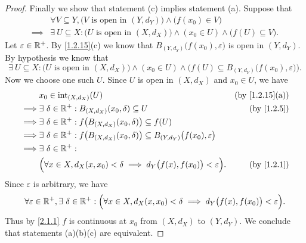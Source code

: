 \begin{proof}
  Finally we show that statement (c) implies statement (a).
  Suppose that
  \begin{align*}
             & \forall V \subseteq Y, \big(V \text{ is open in } (Y, d_Y)\big) \land \big(f(x_0) \in V\big)                          \\
    \implies & \exists\ U \subseteq X : \big(U \text{ is open in } (X, d_X)\big) \land (x_0 \in U) \land \big(f(U) \subseteq V\big).
  \end{align*}
  Let \(\varepsilon \in \mathbb{R}^+\).
  By \cref{1.2.15}(c) we know that \(B_{(Y, d_Y)}\big(f(x_0), \varepsilon\big)\) is open in \((Y, d_Y)\).
  By hypothesis we know that
  \[
    \exists\ U \subseteq X : \big(U \text{ is open in } (X, d_X)\big) \land (x_0 \in U) \land \Big(f(U) \subseteq B_{(Y, d_Y)}\big(f(x_0), \varepsilon\big)\Big).
  \]
  Now we choose one such \(U\).
  Since \(U\) is open in \((X, d_X)\) and \(x_0 \in U\), we have
  \begin{align*}
             & x_0 \in \text{int}_{(X, d_X)}(U)                                                                                    & \text{(by \cref{1.2.15}(a))} \\
    \implies & \exists\ \delta \in \R^+ : B_{(X, d_X)}(x_0, \delta) \subseteq U                                                    & \text{(by \cref{1.2.5})}     \\
    \implies & \exists\ \delta \in \R^+ : f\big(B_{(X, d_X)}(x_0, \delta)\big) \subseteq f(U)                                                                     \\
    \implies & \exists\ \delta \in \R^+ : f\big(B_{(X, d_X)}(x_0, \delta)\big) \subseteq B_{(Y, d_Y)}\big(f(x_0), \varepsilon\big)                                \\
    \implies & \exists\ \delta \in \R^+ :                                                                                                                         \\
             & \Big(\forall x \in X, d_X(x, x_0) < \delta \implies d_Y\big(f(x), f(x_0)\big) < \varepsilon\Big).                   & \text{(by \cref{1.2.1})}
  \end{align*}
  Since \(\varepsilon\) is arbitrary, we have
  \[
    \forall \varepsilon \in \mathbb{R}^+, \exists\ \delta \in \mathbb{R}^+ : \Big(\forall x \in X, d_X(x, x_0) < \delta \implies d_Y\big(f(x), f(x_0)\big) < \varepsilon\Big).
  \]
  Thus by \cref{2.1.1} \(f\) is continuous at \(x_0\) from \((X, d_X)\) to \((Y, d_Y)\).
  We conclude that statements (a)(b)(c) are equivalent.
\end{proof}

